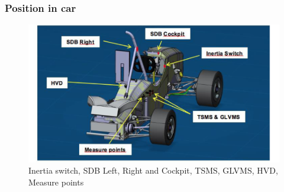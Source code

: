 \subsubsection{Position in car}

\begin{figure}[H]
	\includegraphics[width=\textwidth]{./img/SDC-positionInCar.png}
	\caption{Inertia switch, SDB Left, Right and Cockpit, TSMS, GLVMS, HVD, Measure points}
	\label{fig:SDC-positionInCar}
\end{figure}